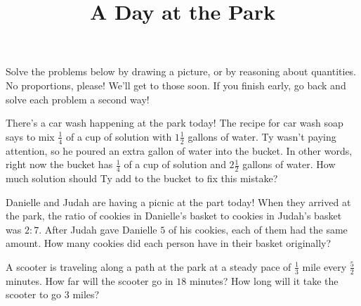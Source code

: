 \documentclass[nooutcomes,noauthor,handout]{ximera}
\title{A Day at the Park}
\begin{document}
\begin{abstract}
\end{abstract}
\maketitle

Solve the problems below by drawing a picture, or by reasoning about quantities. No proportions, please! We'll get to those soon.  If you finish early, go back and solve each problem a second way!


\begin{problem}
There's a car wash happening at the park today!  The recipe for car wash soap says to mix $\frac{1}{4}$ of a cup of solution with $1 \frac{1}{2}$ gallons of water.  Ty wasn't paying attention, so he poured an extra gallon of water into the bucket.  In other words, right now the bucket has $\frac{1}{4}$ of a cup of solution and $2 \frac{1}{2}$ gallons of water.  How much solution should Ty add to the bucket to fix this mistake?

\end{problem}


\begin{problem}
Danielle and Judah are having a picnic at the part today!  When they arrived at the park, the ratio of cookies in Danielle's basket to cookies in Judah's basket was $2:7$.  After Judah gave Danielle $5$ of his cookies, each of them had the same amount.  How many cookies did each person have in their basket originally?
\end{problem}

\begin{problem}
A scooter is traveling along a path at the park at a steady pace of $\frac{1}{3}$ mile every $\frac{5}{2}$ minutes.  How far will the scooter go in $18$ minutes?  How long will it take the scooter to go $3$ miles?
\end{problem}
\end{document}
